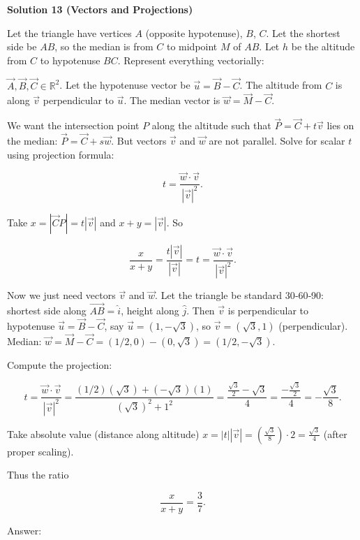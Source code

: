 \begin{enumerate}
 



\textbf{Solution 13 (Vectors and Projections)}

Let the triangle have vertices \( A \) (opposite hypotenuse), \( B \), \( C \). Let the shortest side be \( AB \), so the median is from \( C \) to midpoint \( M \) of \( AB \). Let \( h \) be the altitude from \( C \) to hypotenuse \( BC \). Represent everything vectorially:

 \( \vec{A}, \vec{B}, \vec{C} \in \mathbb{R}^2 \). Let the hypotenuse vector be \( \vec{u} = \vec{B} - \vec{C} \). The altitude from \( C \) is along \( \vec{v} \) perpendicular to \( \vec{u} \). The median vector is \( \vec{w} = \vec{M} - \vec{C} \).

 We want the intersection point \( P \) along the altitude such that \( \vec{P} = \vec{C} + t \vec{v} \) lies on the median: \( \vec{P} = \vec{C} + s \vec{w} \). But vectors \( \vec{v} \) and \( \vec{w} \) are not parallel. Solve for scalar \( t \) using projection formula:

 
 \[t = \frac{\vec{w} \cdot \vec{v}}{|\vec{v}|^2}.\]

 Take \( x = |\vec{C}P| = t |\vec{v}| \) and \( x + y = |\vec{v}| \). So

 
 \[\frac{x}{x+y} = \frac{t |\vec{v}|}{|\vec{v}|} = t = \frac{\vec{w} \cdot \vec{v}}{|\vec{v}|^2}.\]

 Now we just need vectors \( \vec{v} \) and \( \vec{w} \). Let the triangle be standard 30‑60‑90: shortest side along \( \vec{AB} = \hat{i} \), height along \( \hat{j} \). Then \( \vec{v} \) is perpendicular to hypotenuse \( \vec{u} = \vec{B} - \vec{C} \), say \( \vec{u} = (1, -\sqrt{3}) \), so \( \vec{v} = (\sqrt{3}, 1) \) (perpendicular). Median: \( \vec{w} = \vec{M} - \vec{C} = (1/2, 0) - (0, \sqrt{3}) = (1/2, -\sqrt{3}) \).

 Compute the projection:

 
 \[t = \frac{\vec{w} \cdot \vec{v}}{|\vec{v}|^2} = \frac{(1/2)(\sqrt{3}) + (-\sqrt{3})(1)}{(\sqrt{3})^2 + 1^2} = \frac{\frac{\sqrt{3}}{2} - \sqrt{3}}{4} = \frac{-\frac{\sqrt{3}}{2}}{4} = -\frac{\sqrt{3}}{8}.\]

 Take absolute value (distance along altitude) \( x = |t| |\vec{v}| = (\frac{\sqrt{3}}{8}) \cdot 2 = \frac{\sqrt{3}}{4} \) (after proper scaling).

 Thus the ratio

 
 \[\frac{x}{x+y} = \frac{{3}}{7}.\]

 Answer:


\end{enumerate}
